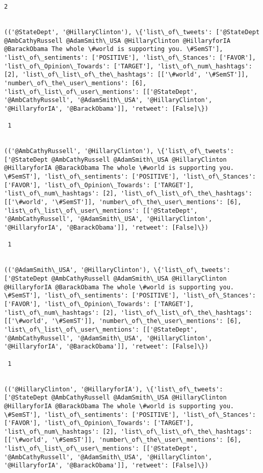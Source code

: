 \documentclass[11pt]{article}
\begin{document}
\begin{Verbatim}[commandchars=\\\{\}]
 2
 

(('@StateDept', '@HillaryClinton'), \{'list\_of\_tweets': ['@StateDept @AmbCathyRussell @AdamSmith\_USA @HillaryClinton @HillaryforIA @BarackObama The whole \#world is supporting you. \#SemST'], 'list\_of\_sentiments': ['POSITIVE'], 'list\_of\_Stances': ['FAVOR'], 'list\_of\_Opinion\_Towards': ['TARGET'], 'list\_of\_num\_hashtags': [2], 'list\_of\_list\_of\_the\_hashtags': [['\#world', '\#SemST']], 'number\_of\_the\_user\_mentions': [6], 'list\_of\_list\_of\_user\_mentions': [['@StateDept', '@AmbCathyRussell', '@AdamSmith\_USA', '@HillaryClinton', '@HillaryforIA', '@BarackObama']], 'retweet': [False]\})

 1
 

(('@AmbCathyRussell', '@HillaryClinton'), \{'list\_of\_tweets': ['@StateDept @AmbCathyRussell @AdamSmith\_USA @HillaryClinton @HillaryforIA @BarackObama The whole \#world is supporting you. \#SemST'], 'list\_of\_sentiments': ['POSITIVE'], 'list\_of\_Stances': ['FAVOR'], 'list\_of\_Opinion\_Towards': ['TARGET'], 'list\_of\_num\_hashtags': [2], 'list\_of\_list\_of\_the\_hashtags': [['\#world', '\#SemST']], 'number\_of\_the\_user\_mentions': [6], 'list\_of\_list\_of\_user\_mentions': [['@StateDept', '@AmbCathyRussell', '@AdamSmith\_USA', '@HillaryClinton', '@HillaryforIA', '@BarackObama']], 'retweet': [False]\})

 1
 

(('@AdamSmith\_USA', '@HillaryClinton'), \{'list\_of\_tweets': ['@StateDept @AmbCathyRussell @AdamSmith\_USA @HillaryClinton @HillaryforIA @BarackObama The whole \#world is supporting you. \#SemST'], 'list\_of\_sentiments': ['POSITIVE'], 'list\_of\_Stances': ['FAVOR'], 'list\_of\_Opinion\_Towards': ['TARGET'], 'list\_of\_num\_hashtags': [2], 'list\_of\_list\_of\_the\_hashtags': [['\#world', '\#SemST']], 'number\_of\_the\_user\_mentions': [6], 'list\_of\_list\_of\_user\_mentions': [['@StateDept', '@AmbCathyRussell', '@AdamSmith\_USA', '@HillaryClinton', '@HillaryforIA', '@BarackObama']], 'retweet': [False]\})

 1
 

(('@HillaryClinton', '@HillaryforIA'), \{'list\_of\_tweets': ['@StateDept @AmbCathyRussell @AdamSmith\_USA @HillaryClinton @HillaryforIA @BarackObama The whole \#world is supporting you. \#SemST'], 'list\_of\_sentiments': ['POSITIVE'], 'list\_of\_Stances': ['FAVOR'], 'list\_of\_Opinion\_Towards': ['TARGET'], 'list\_of\_num\_hashtags': [2], 'list\_of\_list\_of\_the\_hashtags': [['\#world', '\#SemST']], 'number\_of\_the\_user\_mentions': [6], 'list\_of\_list\_of\_user\_mentions': [['@StateDept', '@AmbCathyRussell', '@AdamSmith\_USA', '@HillaryClinton', '@HillaryforIA', '@BarackObama']], 'retweet': [False]\})


\end{Verbatim}
\end{document}
